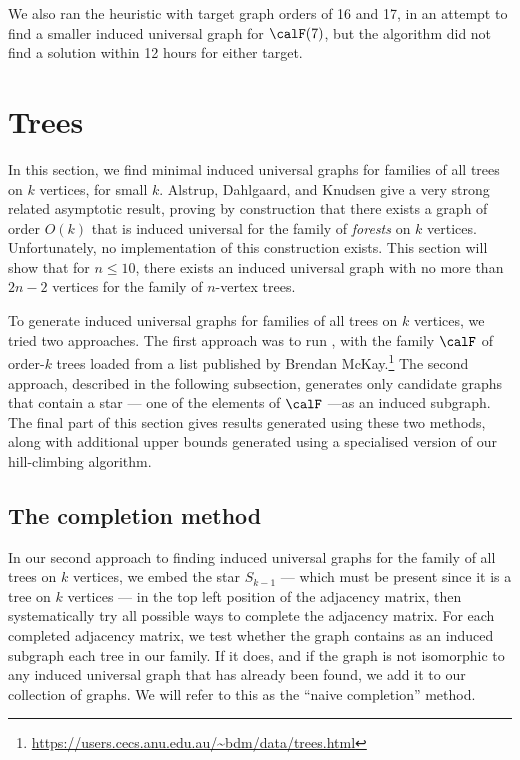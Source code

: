 We also ran the heuristic with target graph orders of 16 and 17, in an
attempt to find a smaller induced universal graph for $\calF(7)$, but the algorithm
did not find a solution within 12 hours for either target.

\section{Trees}\label{sec:trees}

In this section, we find minimal induced universal graphs for families
of all trees on $k$ vertices, for small $k$.
Alstrup, Dahlgaard, and Knudsen \cite{DBLP:journals/jacm/AlstrupDK17}
give a very strong related asymptotic result, proving by construction that
there exists a graph of order $O(k)$ that is induced universal for the family of
\emph{forests} on $k$ vertices.  Unfortunately, no implementation of this
construction exists.  This section will show that for $n \leq 10$, there
exists an induced universal graph with no more than $2n - 2$ vertices
for the family of $n$-vertex trees.

To generate induced universal graphs for families of
all trees on $k$ vertices, we tried two approaches.
The first approach was to run , with the family
$\calF$ of order-$k$ trees loaded from
a list published by Brendan
McKay.\footnote{\url{https://users.cecs.anu.edu.au/~bdm/data/trees.html}}
The second approach, described in the following subsection, generates
only candidate graphs that contain a star --- one of the elements
of $\calF$ ---as an induced subgraph.  The final part of this section
gives results generated using these two methods, along with additional
upper bounds generated using a specialised version of our hill-climbing
algorithm.

\subsection{The completion method}

In our second approach to finding induced universal graphs for the
family of all trees on $k$ vertices, we embed the star $S_{k-1}$ --- which must be
present since it is a tree on $k$ vertices --- in the top left position
of the adjacency matrix, then systematically try all possible ways to complete
the adjacency matrix.  For each completed adjacency matrix, we test whether
the graph contains as an induced subgraph each tree in our family.
If it does, and if the graph is not isomorphic to any induced universal
graph that has already been found, we add it to our collection of graphs.
We will refer to this as the ``naive completion'' method.

